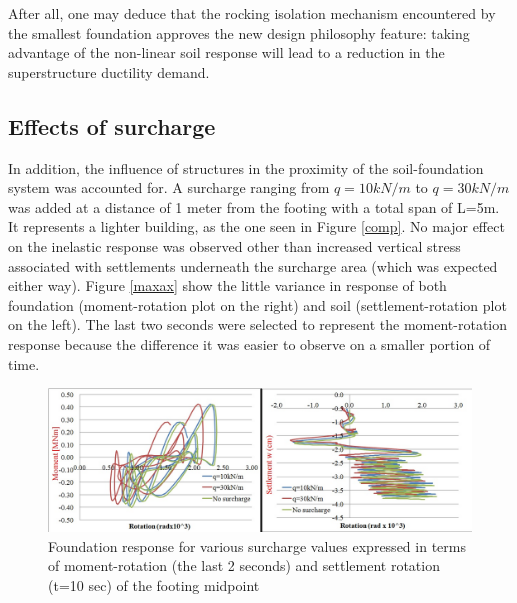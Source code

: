 

After all, one may deduce that the rocking isolation mechanism encountered by the smallest foundation approves the new design philosophy feature: taking advantage of the non-linear soil response will lead to a reduction in the superstructure ductility demand. 


\subsection{Effects of surcharge}
In addition, the influence of structures in the proximity of the soil-foundation system was accounted for. A surcharge ranging from $q=10kN/m$ to $q=30kN/m$ was added at a distance of 1 meter from the footing with a total span of L=5m. It represents a lighter building, as the one seen in Figure \ref{comp}. No major effect on the inelastic response was observed other than increased vertical stress associated with settlements underneath the surcharge area (which was expected either way). Figure \ref{maxax} show the little variance in response of both foundation (moment-rotation plot on the right) and soil (settlement-rotation plot on the left). The last two seconds were selected to represent the moment-rotation response because the difference it was easier to observe on a smaller portion of time.

	\begin{figure}[!h]
		\centering
		\includegraphics[width=0.9 \linewidth]{"surcharge2"}
		\caption{Foundation response for various surcharge values expressed in terms of moment-rotation (the last 2 seconds) and settlement rotation (t=10 sec) of the footing midpoint}
		\label{surch}
	\end{figure}

